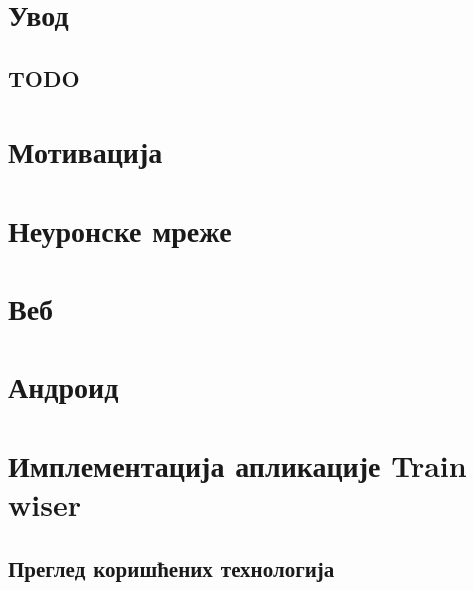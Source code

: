 \documentclass[12pt,oneside]{memoir}
\begin{document}
\frontmatter
\naslovna
\komisija
\posveta{}
\apstrakt
\tableofcontents*

\mainmatter

\chapter{Увод}

\section{TODO}



\chapter{Мотивација}

\chapter{Неуронске мреже} %

\chapter{Веб} %

\chapter{Андроид} %

\chapter{Имплементација апликације Train wiser}
\section{Преглед коришћених технологија}
\end{document}
